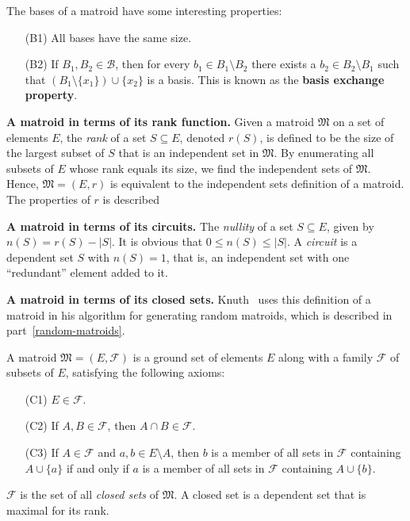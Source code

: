 The bases of a matroid have some interesting properties:

\begin{enumerate}[align=left]
  \item [(B1)] All bases have the same size.
  \item [(B2)] If $B_1, B_2 \in \mathcal{B}$, then for every $b_1 \in B_1 \setminus B_2$ there exists a $b_2 \in B_2 \setminus B_1$ such that $(B_1 \setminus \{x_1\}) \cup \{x_2\}$ is a basis. This is known as the \textbf{basis exchange property}.
\end{enumerate}



\textbf{A matroid in terms of its rank function.} Given a matroid $\mathfrak{M}$ on a set of elements $E$, the \textit{rank} of a set $S \subseteq E$, denoted $r(S)$, is defined to be the size of the largest subset of $S$ that is an independent set in $\mathfrak{M}$. By enumerating all subsets of $E$ whose rank equals its size, we find the independent sets of $\mathfrak{M}$. Hence, $\mathfrak{M} = (E, r)$ is equivalent to the independent sets definition of a matroid. The properties of $r$ is described



\textbf{A matroid in terms of its circuits.} The \textit{nullity} of a set $S \subseteq E$, given by $n(S) = r(S) - |S|$. It is obvious that $0 \leq n(S) \leq |S|$. A \textit{circuit} is a dependent set $S$ with $n(S) = 1$, that is, an independent set with one ``redundant'' element added to it. \skelpar



\textbf{A matroid in terms of its closed sets.} Knuth \cite{knuth-1975} \cite{knuth-1975} uses this definition of a matroid in his algorithm for generating random matroids, which is described in part \ref{random-matroids}.

A matroid $\mathfrak{M} = (E, \mathcal{F})$ is a ground set of elements $E$ along with a family $\mathcal{F}$ of subsets of $E$, satisfying the following axioms:
\begin{itemize}
  \item [(C1)] $E \in \mathcal{F}$.
  \item [(C2)] If $A, B \in \mathcal{F}$, then $A \cap B \in \mathcal{F}$.
  \item [(C3)] If $A \in \mathcal{F}$ and $a,b \in E \setminus A$, then $b$ is a member of all sets in $\mathcal{F}$ containing $A \cup \{a\}$ if and only if $a$ is a member of all sets in $\mathcal{F}$ containing $A \cup \{b\}$.
\end{itemize}

$\mathcal{F}$ is the set of all \textit{closed sets} of $\mathfrak{M}$. A closed set is a dependent set that is maximal for its rank.

\skelpar
